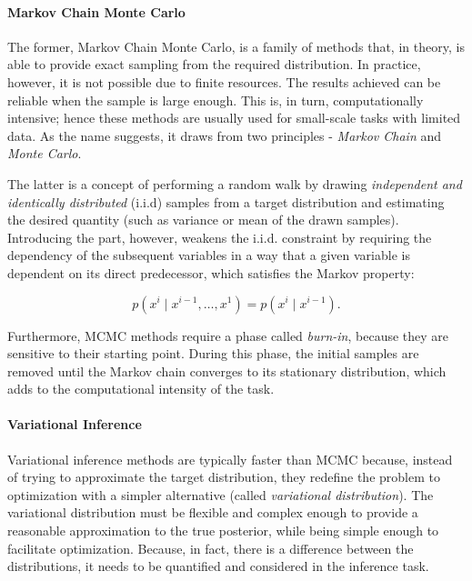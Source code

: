 \paragraph{Markov Chain Monte Carlo}
The former, Markov Chain Monte Carlo, is a family of methods that, in theory, is able to provide exact sampling from the required distribution. In practice, however, it is not possible due to finite resources. The results achieved can be reliable when the sample is large enough. This is, in turn, computationally intensive; hence these methods are usually used for small-scale tasks with limited data. As the name suggests, it draws from two principles - \textit{Markov Chain} and \textit{Monte Carlo}.

\vspace{\baselineskip}
The latter is a concept of performing a random walk by drawing \textit{independent and identically distributed} (i.i.d) samples from a target distribution and estimating the desired quantity (such as variance or mean of the drawn samples). Introducing the  part, however, weakens the i.i.d. constraint by requiring the dependency of the subsequent variables in a way that a given variable is dependent on its direct predecessor, which satisfies the Markov property:

\begin{equation}
    p(x^i \mid x^{i-1}, \dots, x^1) = p(x^i \mid x^{i-1}).
\end{equation}

Furthermore, MCMC methods require a phase called \textit{burn-in}, because they are sensitive to their starting point. During this phase, the initial samples are removed until the Markov chain converges to its stationary distribution, which adds to the computational intensity of the task.

\paragraph{Variational Inference}\label{paragraph:vi}
Variational inference methods are typically faster than MCMC because, instead of trying to approximate the target distribution, they redefine the problem to optimization with a simpler alternative (called \textit{variational distribution}). The variational distribution must be flexible and complex enough to provide a reasonable approximation to the true posterior, while being simple enough to facilitate optimization. Because, in fact, there is a difference between the distributions, it needs to be quantified and considered in the inference task. 

